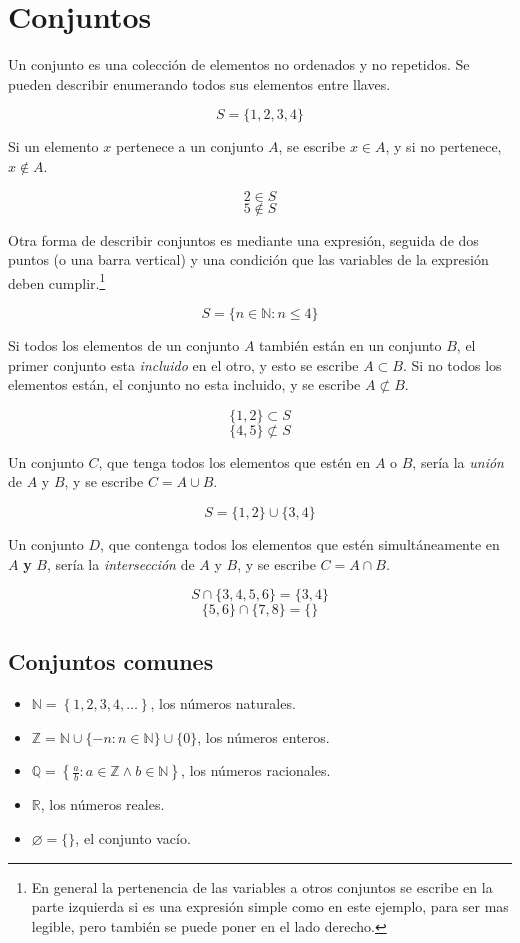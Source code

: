 \documentclass[../teoria.root.tex]{subfiles}
\begin{document}
\section{Conjuntos}

Un conjunto es una colección de elementos no ordenados y no repetidos. Se
pueden describir enumerando todos sus elementos entre llaves.

\[S=\{1,2,3,4\}\]

Si un elemento $x$ pertenece a un conjunto $A$, se escribe $x\in A$, y si no
pertenece, $x\notin A$.

\[2\in S\]
\[5\notin S\]

Otra forma de describir conjuntos es mediante una expresión, seguida de dos
puntos (o una barra vertical) y una condición que las variables de la expresión
deben cumplir.\footnote{En general la pertenencia de las variables a otros
conjuntos se escribe en la parte izquierda si es una expresión simple como en
este ejemplo, para ser mas legible, pero también se puede poner en el lado
derecho.}

\[S=\{n\in\mathbb{N}:n\leq4\}\]

Si todos los elementos de un conjunto $A$ también están en un conjunto $B$, el
primer conjunto esta \textit{incluido} en el otro, y esto se escribe $A\subset
B$. Si no todos los elementos están, el conjunto no esta incluido, y se escribe
$A\not\subset B$.

\[\{1,2\}\subset S\]
\[\{4,5\}\not\subset S\]

Un conjunto $C$, que tenga todos los elementos que estén en $A$ o $B$, sería la
\textit{unión} de $A$ y $B$, y se escribe $C=A\cup B$.

\[S=\{1,2\}\cup\{3,4\}\]

Un conjunto $D$, que contenga todos los elementos que estén simultáneamente en
$A$ \textbf{y} $B$, sería la \textit{intersección} de $A$ y $B$, y se escribe
$C=A\cap B$.

\[S\cap\{3,4,5,6\}=\{3,4\}\]
\[\{5,6\}\cap\{7,8\}=\{\}\]

\subsection{Conjuntos comunes}

\begin{itemize}
	\item $\mathbb{N}=\left\{1,2,3,4,\ldots\right\}$, los números naturales.
	\item $\mathbb{Z}=\mathbb{N}\cup\{-n:n\in\mathbb{N}\}\cup\{0\}$, los números enteros.
	\item $\mathbb{Q}=\left\{\frac{a}{b}:a\in\mathbb{Z}\land b\in\mathbb{N}\right\}$, los números racionales.
	\item $\mathbb{R}$, los números reales.
	\item $\varnothing=\{\}$, el conjunto vacío.
\end{itemize}
\end{document}
